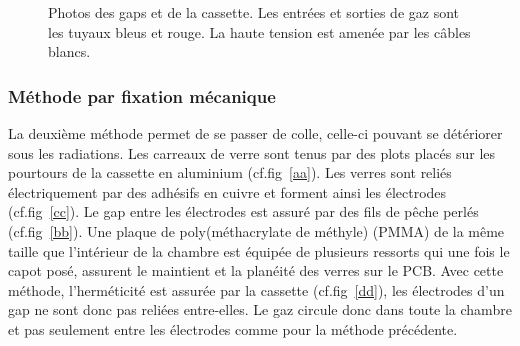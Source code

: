 \begin{figure}[ht!]
\begin{minipage}[t]{.45\textwidth}
    \end{minipage}
 	\caption{Photos des gaps et de la cassette. Les entrées et sorties de gaz sont les tuyaux bleus et rouge. La haute tension est amenée par les câbles blancs.}
 	\label{colle}
 \end{figure}
 
 \subsubsection{Méthode par fixation mécanique}
 La deuxième méthode permet de se passer de colle, celle-ci pouvant se détériorer sous les radiations. Les carreaux de verre sont tenus par des plots placés sur les pourtours de la cassette en aluminium (cf.fig~\ref{aa}). Les verres sont reliés électriquement par des adhésifs en cuivre et forment ainsi les électrodes (cf.fig~\ref{cc}). Le gap entre les électrodes est assuré par des fils de pêche perlés (cf.fig~\ref{bb}). Une plaque de poly(méthacrylate de méthyle) (PMMA) de la même taille que l'intérieur de la chambre est équipée de plusieurs ressorts qui une fois le capot posé, assurent le maintient et la planéité des verres sur le PCB.  Avec cette méthode, l'herméticité est assurée par la cassette (cf.fig~\ref{dd}), les électrodes d'un gap ne sont donc pas reliées entre-elles. Le gaz circule donc dans toute la chambre et pas seulement entre les électrodes comme pour la méthode précédente.
 
